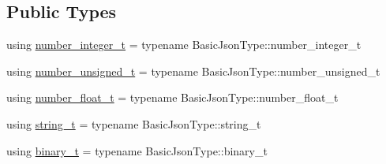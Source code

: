 \subsection*{Public Types}
\begin{DoxyCompactItemize}
\item 
using \hyperlink{classnlohmann_1_1detail_1_1json__sax__acceptor_a41876b17c0e8bdb55580eaf5e4e2ded8}{number\+\_\+integer\+\_\+t} = typename Basic\+Json\+Type\+::number\+\_\+integer\+\_\+t
\item 
using \hyperlink{classnlohmann_1_1detail_1_1json__sax__acceptor_ae07454608ea6f3cfb765f95e3c850043}{number\+\_\+unsigned\+\_\+t} = typename Basic\+Json\+Type\+::number\+\_\+unsigned\+\_\+t
\item 
using \hyperlink{classnlohmann_1_1detail_1_1json__sax__acceptor_a5502f483fc60a1bcd73e0e46b6ab36e4}{number\+\_\+float\+\_\+t} = typename Basic\+Json\+Type\+::number\+\_\+float\+\_\+t
\item 
using \hyperlink{classnlohmann_1_1detail_1_1json__sax__acceptor_a3a8078bbf865ec355106f6048241609a}{string\+\_\+t} = typename Basic\+Json\+Type\+::string\+\_\+t
\item 
using \hyperlink{classnlohmann_1_1detail_1_1json__sax__acceptor_a56346d95ee4e539eaded2e6826fecf66}{binary\+\_\+t} = typename Basic\+Json\+Type\+::binary\+\_\+t
\end{DoxyCompactItemize}
